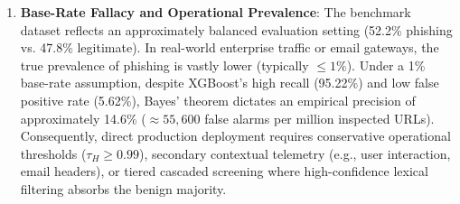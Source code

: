 \begin{enumerate}
    \item \textbf{Base-Rate Fallacy and Operational Prevalence}: The benchmark dataset reflects an approximately balanced evaluation setting (52.2\% phishing vs. 47.8\% legitimate). In real-world enterprise traffic or email gateways, the true prevalence of phishing is vastly lower (typically $\le 1\%$). Under a 1\% base-rate assumption, despite XGBoost's high recall (95.22\%) and low false positive rate (5.62\%), Bayes' theorem dictates an empirical precision of approximately 14.6\% ($\approx 55,600$ false alarms per million inspected URLs). Consequently, direct production deployment requires conservative operational thresholds ($\tau_H \ge 0.99$), secondary contextual telemetry (e.g., user interaction, email headers), or tiered cascaded screening where high-confidence lexical filtering absorbs the benign majority.
\end{enumerate}

